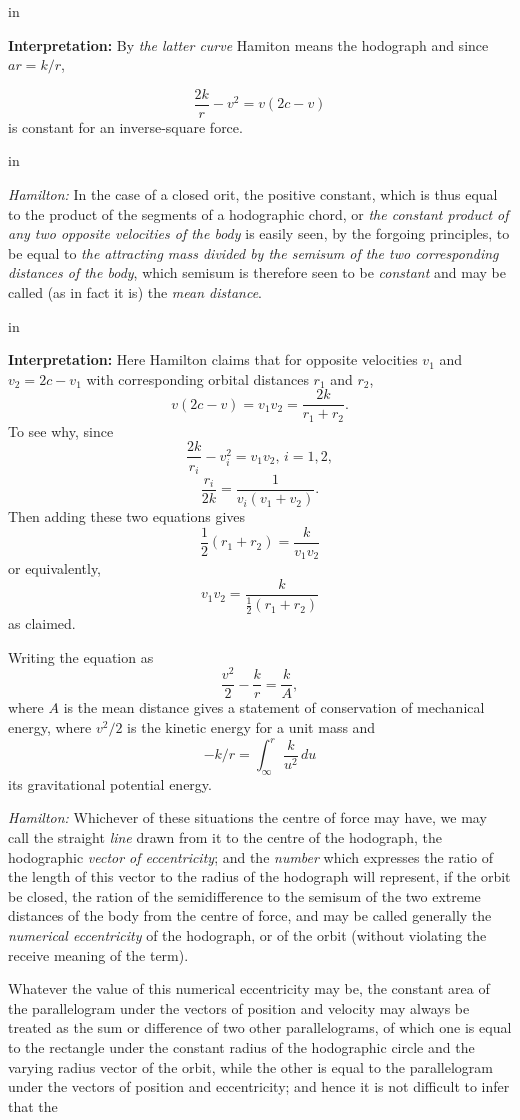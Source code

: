 \documentclass{ximera}
\newcommand{\pskip}{\vskip 0.1 in}
\begin{document}
\pskip


{\bf Interpretation:} By \emph{the latter curve} Hamiton means the hodograph and since $ar = k/r$, 

\[
   \frac{2k}{r} -  v^2 = v(2c-v)
\]
is constant for an inverse-square force.

\pskip

\emph{Hamilton:} In the case of a closed orit, the positive constant, which is thus equal to the product of the segments of a hodographic chord, or \emph{the constant product of any two opposite velocities of the body} is easily seen, by the forgoing principles, to be equal to \emph{the attracting mass divided by the semisum of the two corresponding distances of the body}, which semisum is therefore seen to be \emph{constant} and may be called (as in fact it is) the \emph{mean distance}.

\pskip

{\bf Interpretation:} Here Hamilton claims that for opposite velocities $v_1$ and $v_2 = 2c - v_1$ with corresponding orbital distances $r_1$ and $r_2$,
\[
   v (2c - v) = v_1 v_2 = \frac{2k}{r_1 + r_2}.
\]
To see why, since
\[
   \frac{2k}{r_i} - v_i^2 = v_1v_2, \, i=1,2,
\]
\[
   \frac{r_i}{2k} = \frac{1}{v_i (v_1 + v_2)}.
\]
Then adding these two equations gives
\[
 \frac{1}{2} \left( r_1 + r_2 \right) = \frac{k}{v_1v_2}
\]
or equivalently,
\[
     v_1v_2 = \frac{k}{\frac{1}{2}\left(r_1 + r_2\right)}
\]
as claimed.

Writing the equation as
\[
  \frac{v^2}{2} - \frac{k}{r} = \frac{k}{A},
\]
where $A$ is the mean distance gives a statement of conservation of mechanical energy, where $v^2/2$ is the kinetic energy for a unit mass and
\[
   -k/r = \int_\infty^r \frac{k}{u^2}\, du 
\]
its gravitational potential energy.


\emph{Hamilton:} Whichever of these situations the centre of force may have, we may call the straight \emph{line} drawn from it to the centre of the hodograph, the hodographic \emph{vector of eccentricity}; and the \emph{number} which expresses the ratio of the length of this vector to the radius of the hodograph will represent, if the orbit be closed, the ration of the semidifference to the semisum of the two extreme distances of the body from the centre of force, and may be called generally the \emph{numerical eccentricity} of the hodograph, or of the orbit (without violating the receive meaning of the term).

Whatever the value of this numerical eccentricity may be, the constant area of the parallelogram under the vectors of position and velocity may always be treated as the sum or difference of two other parallelograms, of which one is equal to the rectangle under the constant radius of the hodographic circle and the varying radius vector of the orbit, while the other is equal to the parallelogram under the vectors of position and eccentricity; and hence it is not difficult to infer that the   
\end{document}
